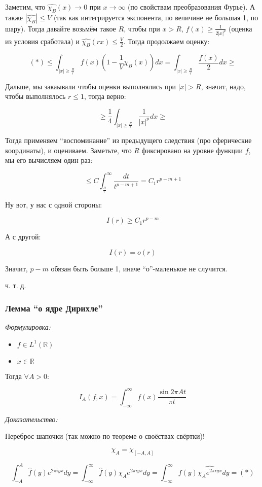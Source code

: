 \documentclass{article}
\begin{document}
Заметим, что $\widehat{\chi_B}(x) \rightarrow 0$ при $x \rightarrow \infty$ (по свойствам преобразования Фурье). А также $|\widehat{\chi_B}| \le V$ (так как интегрируется экспонента, по величине не большая 1, по шару). Тогда давайте возьмём такое $R$, чтобы при $x > R$, $f(x) \ge \frac{1}{2|x|^p}$ (оценка из условия сработала) и $\widehat{\chi_B}(rx) \le \frac{V}{2}$. Тогда продолжаем оценку:

\[(*) \le \int_{|x| \ge \frac{R}{r}} f(x)\left(1 - \frac{1}{V}\widehat{\chi_B}(x)\right)dx = \int_{|x| \ge \frac{R}{r}} \frac{f(x)}{2}dx \ge \]

Дальше, мы закаывали чтобы оценки выполнялись при $|x| > R$, значит, надо, чтобы выполнялось $r \le 1$, тогда верно:

\[\ge \frac{1}{4} \int_{|x| \ge \frac{R}{r}} \frac{1}{|x|^p} dx \ge \]

Тогда применяем ``воспоминание'' из предыдущего следствия (про сферические координаты), и оцениваем. Заметьте, что $R$ фиксировано на уровне функции $f$, мы его вычисляем один раз:

\[\le C \int_{\frac{R}{r}}^{\infty} \frac{dt}{t^{p - m + 1}} = C_1 r^{ p - m + 1}\]

Ну вот, у нас с одной стороны:

\[I(r) \ge C_1 r^{p - m}\]

А с другой:

\[I(r) = o(r)\]

Значит, $p - m$ обязан быть больше 1, иначе ``о''-маленькое не случится.

ч. т. д. 
\subsubsection{Лемма ``о ядре Дирихле''}
\textit{Формулировка:}

\begin{itemize}
    \item $f \in L^1(\mathbb{R})$
    \item $x \in \mathbb{R}$
\end{itemize}

Тогда $\forall A > 0$:

\[I_A(f, x) = \int_{-\infty}^{\infty}f(x)\frac{\sin 2\pi A t}{\pi t}\]

\textit{Доказательство:}

Переброс шапочки (так можно по теореме о своёствах свёртки)!

\[\chi_A = \chi_{[-A, A]}\]

\[\int_{-A}^{A} \hat{f}(y)e^{2\pi i y x}dy = \int_{-\infty}^{\infty} \hat{f}(y)\chi_Ae^{2\pi i y x}dy = \int_{-\infty}^{\infty} f(y)\widehat{\chi_Ae^{2\pi i y x}}dy = (*)\]
\end{document}
